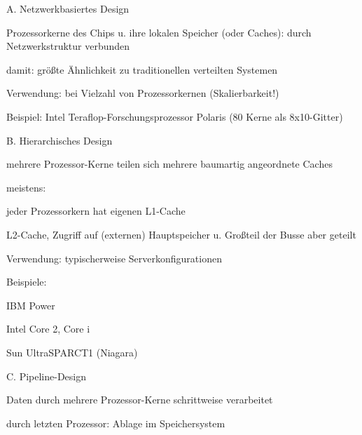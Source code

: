 \documentclass[a4paper]{article}
\begin{document}
\begin{multicols}{3}
    \begin{itemize*}
        \item A. Netzwerkbasiertes Design
        \begin{itemize*}
            \item Prozessorkerne des Chips u. ihre lokalen Speicher (oder Caches): durch Netzwerkstruktur verbunden
            \item damit: größte Ähnlichkeit zu traditionellen verteilten Systemen
            \item Verwendung: bei Vielzahl von Prozessorkernen (Skalierbarkeit!)
            \item Beispiel: Intel Teraflop-Forschungsprozessor Polaris (80 Kerne als 8x10-Gitter)
        \end{itemize*}
        \item B. Hierarchisches Design
        \begin{itemize*}
            \item mehrere Prozessor-Kerne teilen sich mehrere baumartig angeordnete Caches
            \item meistens: \begin{itemize*} \item jeder Prozessorkern hat eigenen L1-Cache \item L2-Cache, Zugriff auf (externen) Hauptspeicher u. Großteil der Busse aber geteilt \end{itemize*}
            \item Verwendung: typischerweise Serverkonfigurationen
            \item Beispiele: \begin{itemize*} \item IBM Power \item Intel Core 2, Core i \item Sun UltraSPARCT1 (Niagara) \end{itemize*}
        \end{itemize*}
        \item C. Pipeline-Design
        \begin{itemize*}
            \item Daten durch mehrere Prozessor-Kerne schrittweise verarbeitet
            \item durch letzten Prozessor: Ablage im Speichersystem

\end{itemize*}
\end{itemize*}
\end{multicols}
\end{document}
